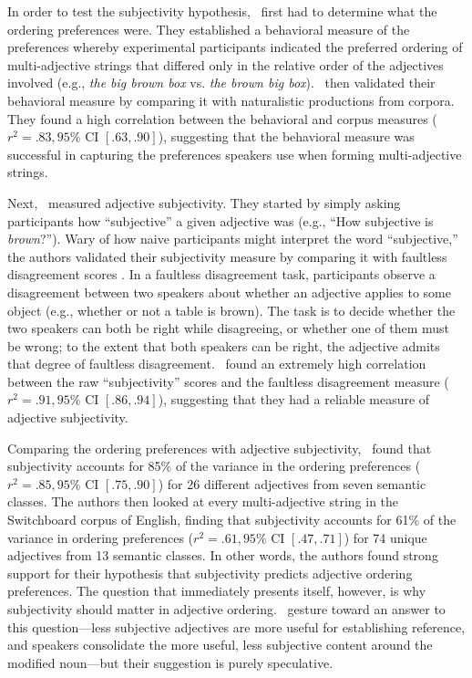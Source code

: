 \documentclass[10pt,a4paper]{article}
\begin{document}
In order to test the subjectivity hypothesis, ~first had to determine what the ordering preferences were. They established a behavioral measure of the preferences whereby experimental participants indicated the preferred ordering of multi-adjective strings that differed only in the relative order of the adjectives involved (e.g., \emph{the big brown box} vs. \emph{the brown big box}). ~then validated their behavioral measure by comparing it with naturalistic productions from corpora. They found a high correlation between the behavioral and corpus measures ($r^{2}=.83, 95\%$ CI $[.63, .90]$), suggesting that the behavioral measure was successful in capturing the preferences speakers use when forming multi-adjective strings.

Next, ~measured adjective subjectivity. They started by simply asking participants how ``subjective'' a given adjective was (e.g., ``How subjective is \emph{brown}?''). Wary of how naive participants might interpret the word ``subjective,'' the authors validated their subjectivity measure by comparing it with faultless disagreement scores \cite{kolbel2004,barker2013,kennedy2013,macfarlane2014}. In a faultless disagreement task, participants observe a disagreement between two speakers about whether an adjective applies to some object (e.g., whether or not a table is brown). The task is to decide whether the two speakers can both be right while disagreeing, or whether one of them must be wrong; to the extent that both speakers can be right, the adjective admits that degree of faultless disagreement. ~found an extremely high correlation between the raw ``subjectivity'' scores and the faultless disagreement measure ($r^{2}=.91, 95\%$ CI $[.86, .94]$), suggesting that they had a reliable measure of adjective subjectivity.

Comparing the ordering preferences with adjective subjectivity, ~found that subjectivity accounts for 85\% of the variance in the ordering preferences ($r^{2}=.85, 95\%$ CI $[.75, .90]$) for 26 different adjectives from seven semantic classes. The authors then looked at every multi-adjective string in the Switchboard corpus of English, finding that subjectivity accounts for 61\% of the variance in ordering preferences ($r^{2}=.61, 95\%$ CI $[.47, .71]$) for 74 unique adjectives from 13 semantic classes. In other words, the authors found strong support for their hypothesis that subjectivity predicts adjective ordering preferences. The question that immediately presents itself, however, is why subjectivity should matter in adjective ordering. ~gesture toward an answer to this question---less subjective adjectives are more useful for establishing reference, and speakers consolidate the more useful, less subjective content around the modified noun---but their suggestion is purely speculative.
\end{document}
